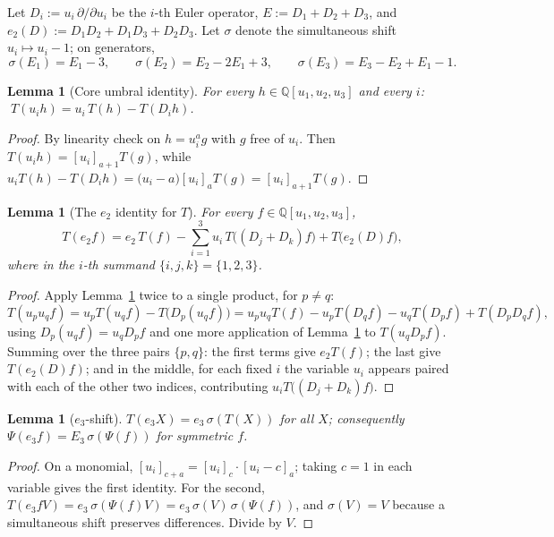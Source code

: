 \documentclass[10pt]{article}
\theoremstyle{plain}
\newtheorem{lemma}[theorem]{Lemma}
\theoremstyle{definition}
\newcommand{\bbQ}{\mathbb{Q}}
\newcommand{\ffal}[2]{[#1]_{#2}}
\begin{document}
Let $D_i:=u_i\,\partial/\partial u_i$ be the $i$-th Euler operator, $E:=D_1+D_2+D_3$, and
$e_2(D):=D_1D_2+D_1D_3+D_2D_3$. Let $\sigma$ denote the simultaneous shift
$u_i\mapsto u_i-1$; on generators,
\begin{equation}\label{eq:sigma}
 \sigma(E_1)=E_1-3,\qquad \sigma(E_2)=E_2-2E_1+3,\qquad \sigma(E_3)=E_3-E_2+E_1-1 .
\end{equation}

\begin{lemma}[Core umbral identity]\label{lem:I1}
For every $h\in\bbQ[u_1,u_2,u_3]$ and every $i$: $\;T(u_i h)=u_i\,T(h)-T(D_i h)$.
\end{lemma}

\begin{proof}
By linearity check on $h=u_i^a g$ with $g$ free of $u_i$. Then $T(u_ih)=\ffal{u_i}{a+1}T(g)$,
while $u_iT(h)-T(D_ih)=\big(u_i-a\big)\ffal{u_i}{a}T(g)=\ffal{u_i}{a+1}T(g)$.
\end{proof}

\begin{lemma}[The $e_2$ identity for $T$]\label{lem:TId}
For every $f\in\bbQ[u_1,u_2,u_3]$,
\[
 T(e_2 f)=e_2\,T(f)-\sum_{i=1}^{3}u_i\,T\big((D_j+D_k)f\big)+T\big(e_2(D)f\big),
\]
where in the $i$-th summand $\{i,j,k\}=\{1,2,3\}$.
\end{lemma}

\begin{proof}
Apply Lemma~\ref{lem:I1} twice to a single product, for $p\ne q$:
\[
 T(u_pu_qf)=u_pT(u_qf)-T\big(D_p(u_qf)\big)
  =u_pu_qT(f)-u_pT(D_qf)-u_qT(D_pf)+T(D_pD_qf),
\]
using $D_p(u_qf)=u_qD_pf$ and one more application of Lemma~\ref{lem:I1} to
$T(u_qD_pf)$. Summing over the three pairs $\{p,q\}$: the first terms give $e_2T(f)$; the
last give $T(e_2(D)f)$; and in the middle, for each fixed $i$ the variable $u_i$ appears
paired with each of the other two indices, contributing $u_iT\big((D_j+D_k)f\big)$.
\end{proof}

\begin{lemma}[$e_3$-shift]\label{lem:e3shift}
$T(e_3X)=e_3\,\sigma(T(X))$ for all $X$; consequently $\Psi(e_3f)=E_3\,\sigma(\Psi(f))$ for
symmetric $f$.
\end{lemma}

\begin{proof}
On a monomial, $\ffal{u_i}{c+a}=\ffal{u_i}{c}\cdot\ffal{u_i-c}{a}$; taking $c=1$ in each
variable gives the first identity. For the second, $T(e_3fV)=e_3\,\sigma(\Psi(f)V)
=e_3\,\sigma(V)\,\sigma(\Psi(f))$, and $\sigma(V)=V$ because a simultaneous shift preserves
differences. Divide by $V$.
\end{proof}
\end{document}
